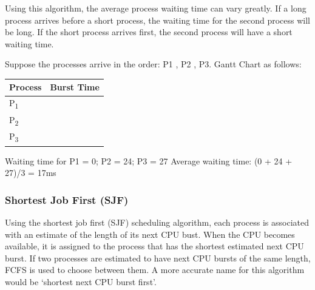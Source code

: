 Using this algorithm, the average process waiting time can vary greatly.
If a long process arrives before a short process, the waiting time for the second process will be long.
If the short process arrives first, the second process will have a short waiting time.

Suppose the processes arrive in the order: P1 , P2 , P3. Gantt Chart as follows:
\renewcommand{\arraystretch}{2} %

\begin{center}
\begin{tabular}{|>{\centering\arraybackslash}m{4cm}|>{\centering\arraybackslash}m{4cm}|}
\hline
\textbf{Process} & \textbf{Burst Time} \\
\hline
P\textsubscript{1} & 24 \\
\hline
P\textsubscript{2} & 3 \\
\hline
P\textsubscript{3} & 3 \\
\hline
\end{tabular}
\end{center}


Waiting time for P1 = 0; P2 = 24; P3 = 27
Average waiting time: (0 + 24 + 27)/3 = 17ms

\subsubsection{Shortest Job First (SJF)}

Using the shortest job first (SJF) scheduling algorithm, each process is associated with an estimate of the length of its next CPU bust.
When the CPU becomes available, it is assigned to the process that has the shortest estimated next CPU burst.
If two processes are estimated to have next CPU bursts of the same length, FCFS is used to choose between them.
A more accurate name for this algorithm would be `shortest next CPU burst first'.

